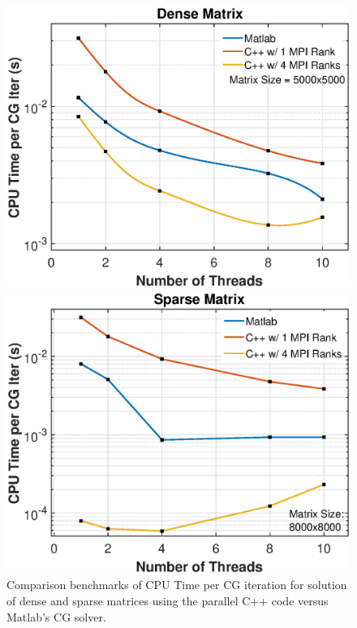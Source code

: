 \documentclass{article}
\begin{document}
\begin{figure}[H]
	\begin{minipage}[b]{0.5\linewidth}
		\centering
		\includegraphics[width=1.0\textwidth]{dense_matrix_benchmarks_log_plot_report.eps}  
	\end{minipage}
	\begin{minipage}[b]{0.5\linewidth}
		\centering
		\includegraphics[width=1.0\textwidth]{sparse_matrix_benchmarks_report.eps}  
	\end{minipage}
	\caption{Comparison benchmarks of CPU Time per CG iteration for solution of dense and sparse matrices using the parallel C++ code versus Matlab's CG solver.}
	\label{fig:benchmarks}
\end{figure}
\end{document}
